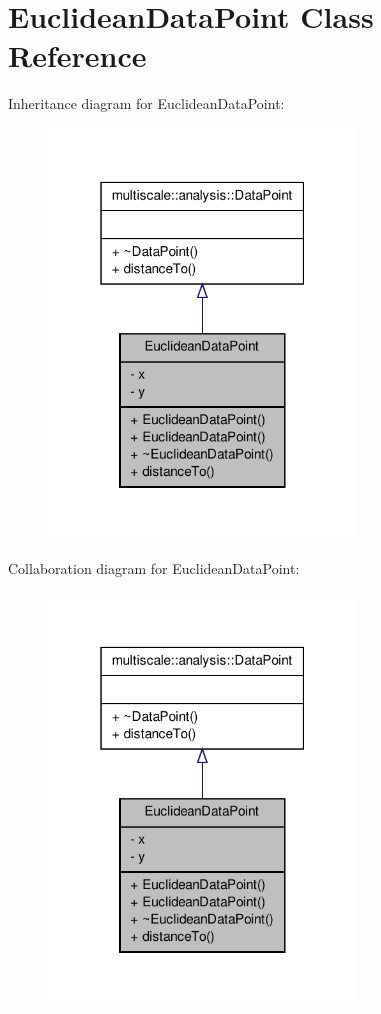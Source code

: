 \hypertarget{classEuclideanDataPoint}{\section{\-Euclidean\-Data\-Point \-Class \-Reference}
\label{classEuclideanDataPoint}
}


\-Inheritance diagram for \-Euclidean\-Data\-Point\-:
\nopagebreak
\begin{figure}[H]
\begin{center}
\leavevmode
\includegraphics[width=232pt]{classEuclideanDataPoint__inherit__graph}
\end{center}
\end{figure}


\-Collaboration diagram for \-Euclidean\-Data\-Point\-:
\nopagebreak
\begin{figure}[H]
\begin{center}
\leavevmode
\includegraphics[width=232pt]{classEuclideanDataPoint__coll__graph}
\end{center}
\end{figure}
